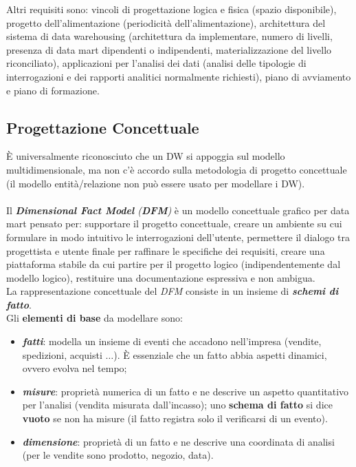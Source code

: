 \documentclass[a4paper, notitlepage, 9pt]{extreport}
\begin{document}
\noindent
Altri requisiti sono: vincoli di progettazione logica e fisica (spazio disponibile), progetto dell'alimentazione (periodicità dell'alimentazione), architettura del sistema di data warehousing (architettura da implementare, numero di livelli, presenza di data mart dipendenti o indipendenti, materializzazione del livello riconciliato), applicazioni per l'analisi dei dati (analisi delle tipologie di interrogazioni e dei rapporti analitici normalmente richiesti), piano di avviamento e piano di formazione.


\subsection*{Progettazione Concettuale}
\MakeUppercase{è} universalmente riconosciuto che un DW si appoggia sul modello multidimensionale, ma non c'è accordo sulla metodologia di progetto concettuale (il modello entità/relazione non può essere usato per modellare i DW).
\\\\
Il \textit{\textbf{Dimensional Fact Model} (\textbf{DFM})} è un modello concettuale grafico per data mart pensato per: supportare il progetto concettuale, creare un ambiente su cui formulare in modo intuitivo le
interrogazioni dell’utente, permettere il dialogo tra progettista e utente finale per raffinare le specifiche dei requisiti, creare una piattaforma stabile da cui partire per il progetto logico (indipendentemente dal modello logico), restituire una documentazione espressiva e non ambigua.\\
La rappresentazione concettuale del \textit{DFM} consiste in un insieme di \textit{\textbf{schemi di fatto}}.\\
Gli \textbf{elementi di base} da modellare sono:
\begin{itemize}
	\item \textit{\textbf{fatti}}: modella un insieme di eventi che accadono nell’impresa (vendite, spedizioni, acquisti $\dots$). \MakeUppercase{è} essenziale che un fatto abbia aspetti dinamici, ovvero evolva nel tempo;
	\item \textit{\textbf{misure}}: proprietà numerica di un fatto e ne descrive un aspetto quantitativo per l’analisi (vendita misurata dall'incasso); uno \textbf{schema di fatto} si dice \textbf{vuoto} se non ha misure (il fatto registra solo il verificarsi di un evento).
	\item \textit{\textbf{dimensione}}: proprietà di un fatto e ne descrive una coordinata di analisi (per le vendite sono prodotto, negozio, data).
\end{itemize}
\end{document}
